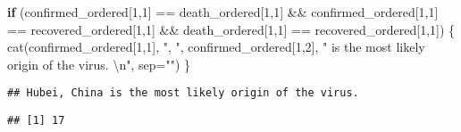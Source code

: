 \documentclass[
]{article}
\newenvironment{Shaded}{\begin{snugshade}}{\end{snugshade}}
\newcommand{\AttributeTok}[1]{\textcolor[rgb]{0.77,0.63,0.00}{#1}}
\newcommand{\CommentTok}[1]{\textcolor[rgb]{0.56,0.35,0.01}{\textit{#1}}}
\newcommand{\ControlFlowTok}[1]{\textcolor[rgb]{0.13,0.29,0.53}{\textbf{#1}}}
\newcommand{\DecValTok}[1]{\textcolor[rgb]{0.00,0.00,0.81}{#1}}
\newcommand{\FloatTok}[1]{\textcolor[rgb]{0.00,0.00,0.81}{#1}}
\newcommand{\FunctionTok}[1]{\textcolor[rgb]{0.00,0.00,0.00}{#1}}
\newcommand{\NormalTok}[1]{#1}
\newcommand{\SpecialCharTok}[1]{\textcolor[rgb]{0.00,0.00,0.00}{#1}}
\newcommand{\StringTok}[1]{\textcolor[rgb]{0.31,0.60,0.02}{#1}}
\begin{document}
\begin{Shaded}
\begin{Highlighting}[]
\ControlFlowTok{if}\NormalTok{ (confirmed\_ordered[}\DecValTok{1}\NormalTok{,}\DecValTok{1}\NormalTok{] }\SpecialCharTok{==}\NormalTok{ death\_ordered[}\DecValTok{1}\NormalTok{,}\DecValTok{1}\NormalTok{] }\SpecialCharTok{\&\&} 
\NormalTok{    confirmed\_ordered[}\DecValTok{1}\NormalTok{,}\DecValTok{1}\NormalTok{] }\SpecialCharTok{==}\NormalTok{ recovered\_ordered[}\DecValTok{1}\NormalTok{,}\DecValTok{1}\NormalTok{] }\SpecialCharTok{\&\&} 
\NormalTok{    death\_ordered[}\DecValTok{1}\NormalTok{,}\DecValTok{1}\NormalTok{] }\SpecialCharTok{==}\NormalTok{ recovered\_ordered[}\DecValTok{1}\NormalTok{,}\DecValTok{1}\NormalTok{])}
\NormalTok{\{}
  \FunctionTok{cat}\NormalTok{(confirmed\_ordered[}\DecValTok{1}\NormalTok{,}\DecValTok{1}\NormalTok{], }\StringTok{", "}\NormalTok{, confirmed\_ordered[}\DecValTok{1}\NormalTok{,}\DecValTok{2}\NormalTok{], }
    \StringTok{" is the most likely origin of the virus. }\SpecialCharTok{\textbackslash{}n}\StringTok{"}\NormalTok{, }\AttributeTok{sep=}\StringTok{""}\NormalTok{)}
\NormalTok{\}}
\end{Highlighting}
\end{Shaded}

\begin{verbatim}
## Hubei, China is the most likely origin of the virus.
\end{verbatim}

\begin{Shaded}
\end{Shaded}

\begin{verbatim}
## [1] 17
\end{verbatim}

\begin{Shaded}
\end{Shaded}
\end{document}

